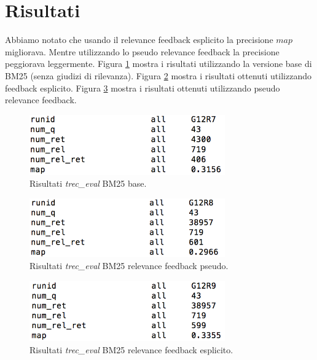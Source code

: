 \documentclass[12pt]{article}
\begin{document}
\section{Risultati}
Abbiamo notato che usando il relevance feedback esplicito la precisione $map$ migliorava. Mentre utilizzando lo pseudo relevance feedback la precisione peggiorava leggermente. Figura \ref{fig:uno} mostra i risultati utilizzando la versione base di BM25 (senza giudizi di rilevanza). Figura \ref{fig:due} mostra i risultati ottenuti utilizzando feedback esplicito. Figura \ref{fig:tre} mostra i risultati ottenuti utilizzando pseudo relevance feedback.

\begin{figure}[htbp]
\begin{center}
\includegraphics[width=0.75\textwidth]{base.png}
\caption{Risultati \textit{trec\_eval} BM25 base.}
\label{fig:uno}
\end{center}
\end{figure}

\begin{figure}[htbp]
\begin{center}
\includegraphics[width=0.75\textwidth]{pseudo.png}
\caption{Risultati \textit{trec\_eval} BM25 relevance feedback pseudo.}
\label{fig:due}
\end{center}
\end{figure}

\begin{figure}[htbp]
\begin{center}
\includegraphics[width=0.75\textwidth]{esplicito.png}
\caption{Risultati \textit{trec\_eval} BM25 relevance feedback esplicito.}
\label{fig:tre}
\end{center}
\end{figure}




\end{document}
